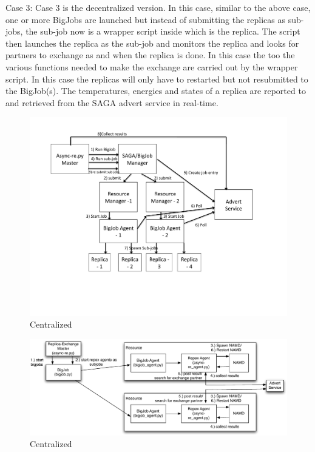 \documentclass[a4paper,10pt]{article}
\begin{document}
Case 3:
Case 3 is the decentralized version. In this case, similar to the above case, one or more BigJobs are launched but instead of submitting the replicas as sub-jobs, the sub-job now is a wrapper script inside which is the replica. The script then launches the replica as the sub-job and monitors the replica and looks for partners to exchange as and when the replica is done. In this case the too the various functions needed to make the exchange are carried out by the wrapper script. In this case the replicas will only have to restarted but not resubmitted to the BigJob(s). The temperatures, energies and states of a replica are reported to and retrieved from the SAGA advert service in real-time.

\begin{figure}
\centering
\includegraphics[scale=0.50]{centralized_architecture.pdf}
\caption{\small Centralized}
\label{Fig:Centralized}
\end{figure}

\begin{figure}
\centering
\includegraphics[scale=0.50]{decentralized_architecture.pdf}
\caption{\small Centralized}
\label{Fig:Centralized}
\end{figure}
\end{document}
